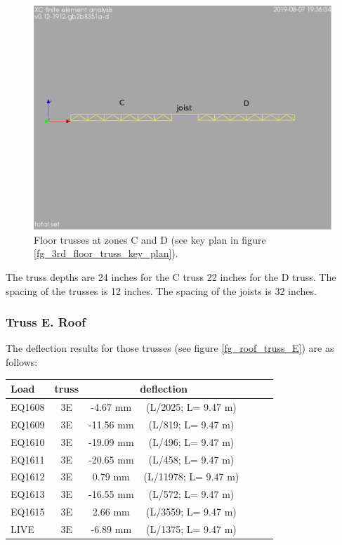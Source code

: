 \begin{figure}
  \begin{center}
  \includegraphics[width=120mm]{figures/floor_truss_CD}
  \end{center}
  \caption{Floor trusses at zones C and D (see key plan in figure \ref{fg_3rd_floor_truss_key_plan}).}\label{fg_floor_truss_CD}
\end{figure}

\noindent The truss depths are 24 inches for the C truss 22 inches for the D truss. The spacing of the trusses is 12 inches. The spacing of the joists is 32 inches. 

\subsubsection{Truss E. Roof}
The deflection results for those trusses (see figure \ref{fg_roof_truss_E}) are as follows:


\begin{center}
  \begin{scriptsize}
  \begin{tabular}{|l|c|c|c|c|c|c|}
    \hline
    \textbf{Load} & \textbf{truss} & \multicolumn{2}{c|}{\textbf{deflection}} \\
    \hline
EQ1608 & 3E & -4.67 mm & (L/2025; L= 9.47 m) \\
EQ1609 & 3E & -11.56 mm & (L/819; L= 9.47 m) \\
EQ1610 & 3E & -19.09 mm & (L/496; L= 9.47 m) \\
EQ1611 & 3E & -20.65 mm & (L/458; L= 9.47 m) \\
EQ1612 & 3E & 0.79 mm & (L/11978; L= 9.47 m) \\
EQ1613 & 3E & -16.55 mm & (L/572; L= 9.47 m) \\
EQ1615 & 3E & 2.66 mm & (L/3559; L= 9.47 m) \\
LIVE & 3E & -6.89 mm & (L/1375; L= 9.47 m) \\
\hline
  \end{tabular}
  \end{scriptsize}
\end{center}

